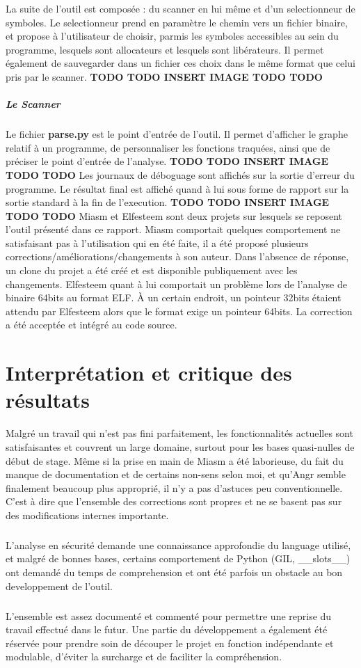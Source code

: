 La suite de l'outil est composée : du scanner en lui même et d'un selectionneur de symboles.
Le selectionneur prend en paramètre le chemin vers un fichier binaire, et propose à l'utilisateur de choisir, parmis les symboles accessibles au sein du programme,
lesquels sont allocateurs et lesquels sont libérateurs. Il permet également de sauvegarder dans un fichier ces choix dans le même format que celui pris par le scanner.
\textbf{TODO TODO INSERT IMAGE TODO TODO}
\subparagraph{Le Scanner}
Le fichier \textbf{parse.py} est le point d'entrée de l'outil. Il permet d'afficher le graphe relatif à un programme, de personnaliser les fonctions traquées, ainsi que de préciser
le point d'entrée de l'analyse.
\textbf{TODO TODO INSERT IMAGE TODO TODO}
Les journaux de déboguage sont affichés sur la sortie d'erreur du programme. Le résultat final est affiché quand à lui sous forme de rapport sur la sortie standard à la fin de l'execution.
\textbf{TODO TODO INSERT IMAGE TODO TODO}
Miasm et Elfesteem sont deux projets sur lesquels se reposent l'outil présenté dans ce rapport. Miasm comportait quelques comportement ne satisfaisant pas à l'utilisation qui en été faite,
il a été proposé plusieurs corrections/améliorations/changements à son auteur. Dans l'absence de réponse, un clone du projet a été créé et est disponible publiquement avec les changements.
Elfesteem quant à lui comportait un problème lors de l'analyse de binaire 64bits au format ELF. À un certain endroit, un pointeur 32bits étaient attendu par Elfesteem alors que le format
exige un pointeur 64bits. La correction a été acceptée et intégré au code source.

\section{Interprétation et critique des résultats}
Malgré un travail qui n'est pas fini parfaitement, les fonctionnalités actuelles sont satisfaisantes et couvrent un large domaine, surtout pour les bases quasi-nulles de début de stage.
Même si la prise en main de Miasm a été laborieuse, du fait du manque de documentation et de certains non-sens selon moi, et qu'Angr semble finalement beaucoup plus approprié, il n'y a pas
d'astuces peu conventionnelle. C'est à dire que l'ensemble des corrections sont propres et ne se basent pas sur des modifications internes importante.
\subparagraph{}
L'analyse en sécurité demande une connaissance approfondie du language utilisé, et malgré de bonnes bases, certains comportement de Python (GIL, \_\_slots\_\_) ont demandé du temps de comprehension
et ont été parfois un obstacle au bon developpement de l'outil.
\subparagraph{}
L'ensemble est assez documenté et commenté pour permettre une reprise du travail effectué  dans le futur. Une partie du développement a également été réservée pour prendre
soin de découper le projet en fonction indépendante et modulable, d'éviter la surcharge et de faciliter la compréhension.
\subparagraph{}
